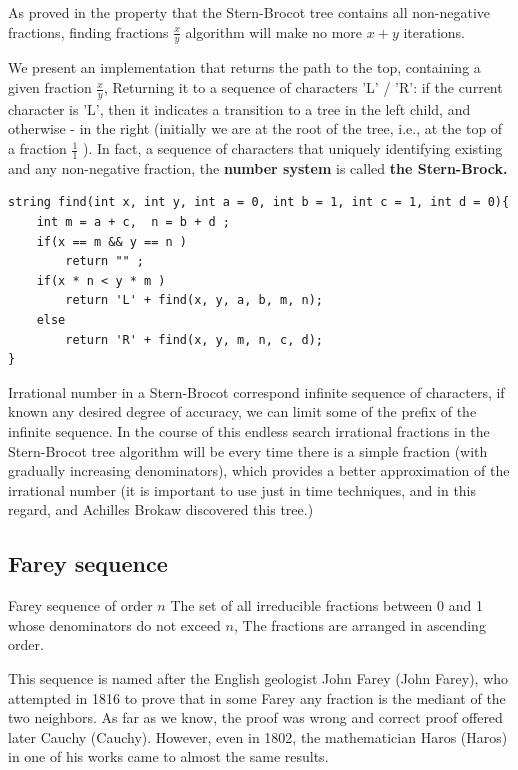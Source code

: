 As proved in the property that the Stern-Brocot tree contains all non-negative fractions, finding fractions $\frac {x} {y}$ algorithm will make no more $x + y$ iterations.

We present an implementation that returns the path to the top, containing a given fraction $\frac {x} {y}$, Returning it to a sequence of characters 'L' / 'R': if the current character is 'L', then it indicates a transition to a tree in the left child, and otherwise - in the right (initially we are at the root of the tree, i.e., at the top of a fraction $\frac {1} {1}$ ). In fact, a sequence of characters that uniquely identifying existing and any non-negative fraction, the \textbf{number system} is called \textbf{the Stern-Brock.}

\begin{verbatim}
string find(int x, int y, int a = 0, int b = 1, int c = 1, int d = 0){
    int m = a + c,  n = b + d ;
    if(x == m && y == n )
        return "" ;
    if(x * n < y * m )
        return 'L' + find(x, y, a, b, m, n);
    else
        return 'R' + find(x, y, m, n, c, d);
} 
\end{verbatim}
Irrational number in a Stern-Brocot correspond infinite sequence of characters, if known any desired degree of accuracy, we can limit some of the prefix of the infinite sequence. In the course of this endless search irrational fractions in the Stern-Brocot tree algorithm will be every time there is a simple fraction (with gradually increasing denominators), which provides a better approximation of the irrational number (it is important to use just in time techniques, and in this regard, and Achilles Brokaw discovered this tree.)

\subsection{ Farey sequence }

Farey sequence of order $n$ The set of all irreducible fractions between 0 and 1 whose denominators do not exceed $n$, The fractions are arranged in ascending order.

This sequence is named after the English geologist John Farey (John Farey), who attempted in 1816 to prove that in some Farey any fraction is the mediant of the two neighbors. As far as we know, the proof was wrong and correct proof offered later Cauchy (Cauchy). However, even in 1802, the mathematician Haros (Haros) in one of his works came to almost the same results.

